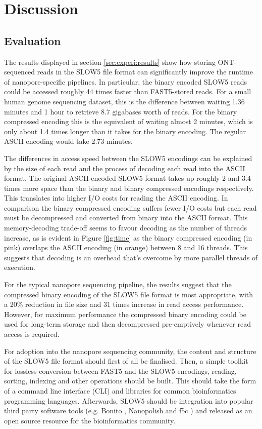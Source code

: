 \section{Discussion}
\label{sec:disc}

\subsection{Evaluation}
\label{sec:disc:eval}

The results displayed in section \ref{sec:experi:results} show how storing ONT-sequenced reads in the SLOW5 file format can significantly improve the runtime of nanopore-specific pipelines. In particular, the binary encoded SLOW5 reads could be accessed roughly 44 times faster than FAST5-stored reads. For a small human genome sequencing dataset, this is the difference between waiting 1.36 minutes and 1 hour to retrieve 8.7 gigabases worth of reads. For the binary compressed encoding this is the equivalent of waiting almost 2 minutes, which is only about 1.4 times longer than it takes for the binary encoding. The regular ASCII encoding would take 2.73 minutes.

The differences in access speed between the SLOW5 encodings can be explained by the size of each read and the process of decoding each read into the ASCII format. The original ASCII-encoded SLOW5 format takes up roughly 2 and 3.4 times more space than the binary and binary compressed encodings respectively. This translates into higher I/O costs for reading the ASCII encoding. In comparison the binary compressed encoding suffers fewer I/O costs but each read must be decompressed and converted from binary into the ASCII format. This memory-decoding trade-off seems to favour decoding as the number of threads increase, as is evident in Figure \ref{fig:time} as the binary compressed encoding (in pink) overlaps the ASCII encoding (in orange) between 8 and 16 threads. This suggests that decoding is an overhead that's overcome by more parallel threads of execution.

For the typical nanopore sequencing pipeline, the results suggest that the compressed binary encoding of the SLOW5 file format is most appropriate, with a 20\% reduction in file size and 31 times increase in read access performance. However, for maximum performance the compressed binary encoding could be used for long-term storage and then decompressed pre-emptively whenever read access is required.

For adoption into the nanopore sequencing community, the content and structure of the SLOW5 file format should first of all be finalised. Then, a simple toolkit for lossless conversion between FAST5 and the SLOW5 encodings, reading, sorting, indexing and other operations should be built. This should take the form of a command line interface (CLI) and libraries for common bioinformatics programming languages. Afterwards, SLOW5 should be integration into popular third party software tools (e.g. Bonito \cite{bonito}, Nanopolish \cite{nanopolish} and f5c \cite{f5c}) and released as an open source resource for the bioinformatics community.

